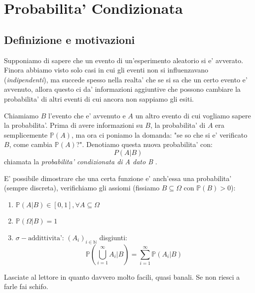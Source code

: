 % 
\chapter{Probabilita' Condizionata}

\section{Definizione e motivazioni}

Supponiamo di sapere che un evento di un'esperimento aleatorio si e' avverato. Finora abbiamo visto solo casi in cui gli eventi non si influenzavano (\textit{indipendenti}), ma succede spesso nella realta' che se si sa che un certo evento e' avvenuto, allora questo ci da' informazioni aggiuntive che possono cambiare la probabilita' di altri eventi di cui ancora non sappiamo gli esiti.

Chiamiamo $ B $ l'evento che e' avvenuto e $ A $ un altro evento di cui vogliamo sapere la probabilita'. Prima di avere informazioni su $ B $, la probabilita' di $ A $ era semplicemente $ \mathbb{P}(A) $, ma ora ci poniamo la domanda: "se so che si e' verificato $ B $, come cambia $ \mathbb{P}(A) $?". Denotiamo questa nuova probabilita' con:
\[
  P(A|B)
\]
chiamata la \textit{probabilita' condizionata di  A  dato  B }.

E' possibile dimostrare che una certa funzione e' anch'essa una probabilita' (sempre discreta), verifichiamo gli assiomi (fissiamo $ B \subseteq \Omega $ con $ \mathbb{P}(B) > 0 $):
\begin{enumerate}
  \item $ \mathbb{P}(A|B) \in [0,1], \forall A \subseteq \Omega $
  \item $ \mathbb{P}(\Omega|B) = 1 $
  \item $ \sigma-\text{addittivita'} $: $ (A_i)_{i \in \mathbb{N}} $ disgiunti:
    \[
      \mathbb{P}(\bigcup_{i=1}^{\infty} A_i|B) = \sum_{i=1}^{\infty} \mathbb{P}(A_i|B)
    \]
\end{enumerate}
Lasciate al lettore in quanto davvero molto facili, quasi banali. Se non riesci a farle fai schifo.


